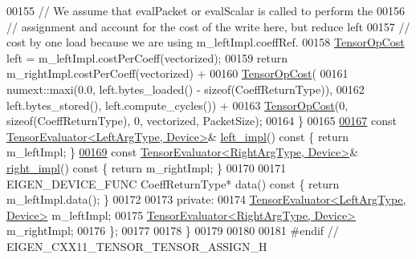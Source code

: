 \begin{DoxyCode}
00155     \textcolor{comment}{// We assume that evalPacket or evalScalar is called to perform the}
00156     \textcolor{comment}{// assignment and account for the cost of the write here, but reduce left}
00157     \textcolor{comment}{// cost by one load because we are using m\_leftImpl.coeffRef.}
00158     \hyperlink{class_eigen_1_1_tensor_op_cost}{TensorOpCost} left = m\_leftImpl.costPerCoeff(vectorized);
00159     \textcolor{keywordflow}{return} m\_rightImpl.costPerCoeff(vectorized) +
00160            \hyperlink{class_eigen_1_1_tensor_op_cost}{TensorOpCost}(
00161                numext::maxi(0.0, left.bytes\_loaded() - \textcolor{keyword}{sizeof}(CoeffReturnType)),
00162                left.bytes\_stored(), left.compute\_cycles()) +
00163            \hyperlink{class_eigen_1_1_tensor_op_cost}{TensorOpCost}(0, \textcolor{keyword}{sizeof}(CoeffReturnType), 0, vectorized, PacketSize);
00164   \}
00165 
\hyperlink{struct_eigen_1_1_tensor_evaluator_3_01const_01_tensor_assign_op_3_01_left_arg_type_00_01_right_arg_type_01_4_00_01_device_01_4_a52e2b2245de4d6d78e747eaf88995d6d}{00167}   \textcolor{keyword}{const} \hyperlink{struct_eigen_1_1_tensor_evaluator}{TensorEvaluator<LeftArgType, Device>}& 
      \hyperlink{struct_eigen_1_1_tensor_evaluator_3_01const_01_tensor_assign_op_3_01_left_arg_type_00_01_right_arg_type_01_4_00_01_device_01_4_a52e2b2245de4d6d78e747eaf88995d6d}{left\_impl}()\textcolor{keyword}{ const }\{ \textcolor{keywordflow}{return} m\_leftImpl; \}
\hyperlink{struct_eigen_1_1_tensor_evaluator_3_01const_01_tensor_assign_op_3_01_left_arg_type_00_01_right_arg_type_01_4_00_01_device_01_4_aeb9deae6affa88fe857daf66d83e38a0}{00169}   \textcolor{keyword}{const} \hyperlink{struct_eigen_1_1_tensor_evaluator}{TensorEvaluator<RightArgType, Device>}& 
      \hyperlink{struct_eigen_1_1_tensor_evaluator_3_01const_01_tensor_assign_op_3_01_left_arg_type_00_01_right_arg_type_01_4_00_01_device_01_4_aeb9deae6affa88fe857daf66d83e38a0}{right\_impl}()\textcolor{keyword}{ const }\{ \textcolor{keywordflow}{return} m\_rightImpl; \}
00170 
00171   EIGEN\_DEVICE\_FUNC CoeffReturnType* data()\textcolor{keyword}{ const }\{ \textcolor{keywordflow}{return} m\_leftImpl.data(); \}
00172 
00173  \textcolor{keyword}{private}:
00174   \hyperlink{struct_eigen_1_1_tensor_evaluator}{TensorEvaluator<LeftArgType, Device>} m\_leftImpl;
00175   \hyperlink{struct_eigen_1_1_tensor_evaluator}{TensorEvaluator<RightArgType, Device>} m\_rightImpl;
00176 \};
00177 
00178 \}
00179 
00180 
00181 \textcolor{preprocessor}{#endif // EIGEN\_CXX11\_TENSOR\_TENSOR\_ASSIGN\_H}
\end{DoxyCode}
